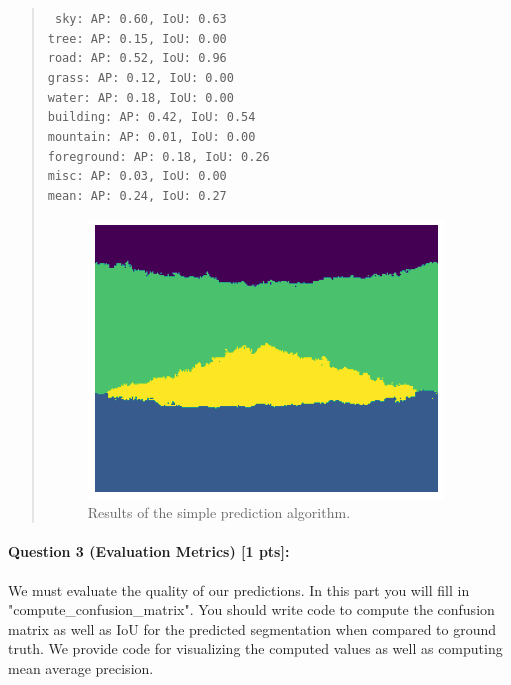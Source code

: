 \documentclass[9pt]{article}
\begin{document}
\begin{quote}
{\centering \tt \small
sky: AP: 0.60, IoU: 0.63 \\
tree: AP: 0.15, IoU: 0.00 \\
road: AP: 0.52, IoU: 0.96 \\
grass: AP: 0.12, IoU: 0.00 \\
water: AP: 0.18, IoU: 0.00 \\
building: AP: 0.42, IoU: 0.54 \\
mountain: AP: 0.01, IoU: 0.00 \\
foreground: AP: 0.18, IoU: 0.26 \\
misc: AP: 0.03, IoU: 0.00 \\
mean: AP: 0.24, IoU: 0.27 \\
}

\begin{figure}[h]
    \centering
    \includegraphics[width=0.5\linewidth]{simple_predict.png}
    \caption{Results of the simple prediction algorithm.}
    \label{fig:simple-predict}
\end{figure}

\end{quote}

\paragraph{Question 3 (Evaluation Metrics) [1 pts]:}  
We must evaluate the quality of our predictions. In this part you will fill in "compute\_confusion\_matrix". You should write code to compute the confusion matrix as well as IoU for the predicted segmentation when compared to ground truth. We provide code for visualizing the computed values as well as computing mean average precision.
\end{document}

